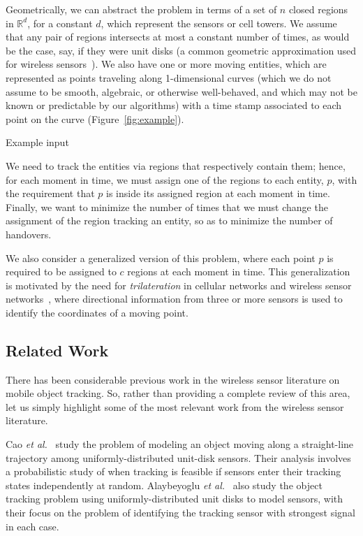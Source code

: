 \documentclass[runningheads]{llncs}
\newcommand {\mathset} [1] {\ensuremath {\mathbb {#1}}}
\newcommand {\R} {\mathset {R}}
\begin{document}
Geometrically, we can abstract the problem in terms of a set of $n$ closed regions in $\R^d$, for a constant $d$, which represent the sensors or cell towers.
We assume that any pair of regions 
intersects at most a constant number of times, as would be the case,
say, if they were unit disks (a common geometric
approximation used for wireless 
sensors~\cite{aekd-tfmt-10,cysa-atdp-05,gtzts-stpea-10,hh-ttqw-05,ppk-eqttt-03,zjr-iddsc-02}).
We also have one or more moving entities,
which are represented as points traveling along 1-dimensional curves (which we do not assume to  be smooth, algebraic, or otherwise well-behaved, and which may not be known or predictable by our algorithms) with a time stamp 
associated to each point on the curve (Figure~\ref{fig:example}).

   {\label{fig:example} Example input}

We need to track the entities via regions that respectively contain them; 
hence, for each moment in time, 
we must assign one of the regions to each entity, $p$,
with the requirement that $p$ is 
inside its assigned region at each moment in time. 
Finally,
we want to minimize the number of 
times that we must change
the assignment of the region tracking an entity, so as to minimize
the number of handovers.

We also consider a generalized version of this problem, where
each point $p$ is required to be assigned to $c$ regions at each 
moment in time.
This generalization is motivated by the need for 
\emph{trilateration} in cellular networks and wireless sensor 
networks~\cite{hellebrandt2002estimating,yl-qtcbi-10},
where directional information from three or more 
sensors is used to identify the coordinates of a moving point.
  
\subsection{Related Work}
There has been considerable previous work in the wireless sensor
literature on mobile object tracking. So, rather than providing a
complete review of this area, let us simply highlight some of the
most relevant work from the wireless sensor literature.

Cao {\it et al.}~\cite{cysa-atdp-05} study 
the problem of modeling an object moving along a straight-line
trajectory among uniformly-distributed 
unit-disk sensors. Their analysis involves a
probabilistic study of when tracking is feasible if sensors enter their
tracking states independently at random.
Alaybeyoglu {\it et al.}~\cite{aekd-tfmt-10}
also study the object tracking problem using uniformly-distributed 
unit disks to model sensors,
with their focus on the problem of identifying the tracking sensor
with strongest signal in each case.
\end{document}
